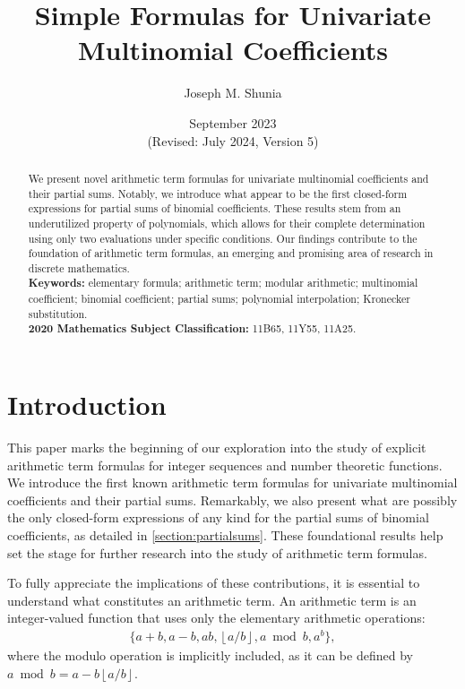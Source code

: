 \documentclass{article}
\title{Simple Formulas for Univariate Multinomial Coefficients}
\author{Joseph M. Shunia}
\date{September 2023 \\ \small (Revised: July 2024, Version 5) \normalsize}
\theoremstyle{plain}
\newcommand{\floor}[1]{\left\lfloor #1 \right\rfloor}
\begin{document}
\maketitle

 \begin{abstract}
 \noindent
We present novel arithmetic term formulas for univariate multinomial coefficients and their partial sums. Notably, we introduce what appear to be the first closed-form expressions for partial sums of binomial coefficients. These results stem from an underutilized property of polynomials, which allows for their complete determination using only two evaluations under specific conditions. Our findings contribute to the foundation of arithmetic term formulas, an emerging and promising area of research in discrete mathematics.
 \\[2mm]
 {\bf Keywords:} elementary formula; arithmetic term; modular arithmetic; multinomial coefficient; binomial coefficient; partial sums; polynomial interpolation; Kronecker substitution.\\[2mm]
 {\bf 2020 Mathematics Subject Classification:} 11B65, 11Y55, 11A25.
 \end{abstract}

\baselineskip=0.20in

\section{Introduction}
This paper marks the beginning of our exploration into the study of explicit arithmetic term formulas for integer sequences and number theoretic functions. We introduce the first known arithmetic term formulas for univariate multinomial coefficients and their partial sums. Remarkably, we also present what are possibly the only closed-form expressions of any kind for the partial sums of binomial coefficients, as detailed in \cref{section:partialsums}. These foundational results help set the stage for further research into the study of arithmetic term formulas.

To fully appreciate the implications of these contributions, it is essential to understand what constitutes an arithmetic term. An arithmetic term is an integer-valued function that uses only the elementary arithmetic operations:
\begin{align*}
    \{ a+b, a-b, ab, \floor{a/b}, a \bmod b, a^b \} ,
\end{align*}
where the modulo operation is implicitly included, as it can be defined by $a \bmod b = a - b \floor{a/b}$.
\end{document}
